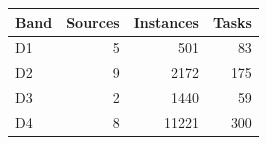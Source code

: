 \begin{tabular}{lrrr}
\toprule
Band & Sources & Instances & Tasks\\\midrule
D1 & 5 & 501 & 83\\
D2 & 9 & 2172 & 175\\
D3 & 2 & 1440 & 59\\
D4 & 8 & 11221 & 300\\
\bottomrule
\end{tabular}
